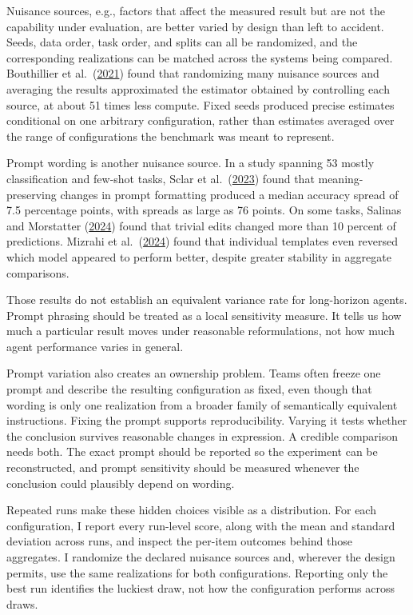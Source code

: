 Nuisance sources, e.g., factors that affect the measured result but are not the capability under evaluation, are better varied by design than left to accident. Seeds, data order, task order, and splits can all be randomized, and the corresponding realizations can be matched across the systems being compared. Bouthillier et al.~(\href{https://arxiv.org/abs/2103.03098}{2021}) found that randomizing many nuisance sources and averaging the results approximated the estimator obtained by controlling each source, at about 51 times less compute. Fixed seeds produced precise estimates conditional on one arbitrary configuration, rather than estimates averaged over the range of configurations the benchmark was meant to represent.

Prompt wording is another nuisance source. In a study spanning 53 mostly classification and few-shot tasks, Sclar et al.~(\href{https://arxiv.org/abs/2310.11324}{2023}) found that meaning-preserving changes in prompt formatting produced a median accuracy spread of 7.5 percentage points, with spreads as large as 76 points. On some tasks, Salinas and Morstatter (\href{https://arxiv.org/abs/2401.03729}{2024}) found that trivial edits changed more than 10 percent of predictions. Mizrahi et al.~(\href{https://arxiv.org/abs/2401.00595}{2024}) found that individual templates even reversed which model appeared to perform better, despite greater stability in aggregate comparisons.

Those results do not establish an equivalent variance rate for long-horizon agents. Prompt phrasing should be treated as a local sensitivity measure. It tells us how much a particular result moves under reasonable reformulations, not how much agent performance varies in general.

Prompt variation also creates an ownership problem. Teams often freeze one prompt and describe the resulting configuration as fixed, even though that wording is only one realization from a broader family of semantically equivalent instructions. Fixing the prompt supports reproducibility. Varying it tests whether the conclusion survives reasonable changes in expression. A credible comparison needs both. The exact prompt should be reported so the experiment can be reconstructed, and prompt sensitivity should be measured whenever the conclusion could plausibly depend on wording.

Repeated runs make these hidden choices visible as a distribution. For each configuration, I report every run-level score, along with the mean and standard deviation across runs, and inspect the per-item outcomes behind those aggregates. I randomize the declared nuisance sources and, wherever the design permits, use the same realizations for both configurations. Reporting only the best run identifies the luckiest draw, not how the configuration performs across draws.

